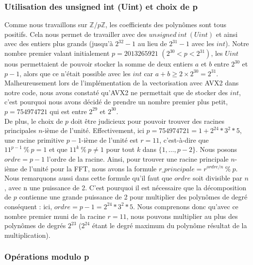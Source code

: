 \documentclass[12pt, a4paper]{article}
\begin{document}
\subsubsection{Utilisation des unsigned int (Uint) et choix de p}

Comme nous travaillons sur $\mathbb{Z}/p\mathbb{Z}$, les coefficients des polynômes sont tous positifs. Cela nous permet de travailler avec des $unsigned\ int\ (Uint)$ et ainsi avec des entiers plus grands (jusqu’à $2^{32}-1$ au lieu de $2^{31}-1$ avec les $int$). Notre nombre premier valant initialement $p=2013265921$ $(2^{30} < p < 2^{31})$, les $Uint$ nous permettaient de pouvoir stocker la somme de deux entiers $a$ et $b$ entre $2^{30}$ et $p-1$, alors que ce n'était possible avec les $int$ car $a+b\geq2\times2^{30}=2^{31}$. \\
\indent Malheureusement lors de l'implémentation de la vectorisation avec AVX2 dans notre code, nous avons constaté qu'AVX2 ne permettait que de stocker des $int$, c'est pourquoi nous avons décidé de prendre un nombre premier plus petit, $p=754974721$ qui est entre $2^{29}$ et  $2^{30}$. \\
\indent De plus, le choix de $p$ doit être judicieux pour pouvoir trouver des racines principales $n$-ième de l'unité. Effectivement, ici $p = 754974721 = 1+2^{24}*3^2*5$, une racine primitive $p-1$-ième de l'unité est $r = 11$, c'est-à-dire que $11^{p-1}\ \%\ p = 1$ et que $11^{k}\ \%\ p \ne 1$ pour tout $k$ dans $\{1,\dots,p-2\}$. Nous posons $ordre = p-1$ l'ordre de la racine. Ainsi, pour trouver une racine principale $n$-ième de l'unité pour la FFT, nous avons la formule $r\_principale = r^{ordre/n}\ \% \ p$. \\
\indent Nous remarquons aussi dans cette formule qu'il faut que $ordre$ soit divisible par $n$, avec n une puissance de 2. C'est pourquoi il est nécessaire que la décomposition de $p$ contienne une grande puissance de 2 pour multiplier des polynômes de degré conséquent : ici, $ordre = p-1 = 2^{24}*3^2*5$. Nous comprenons donc qu'avec ce nombre premier muni de la racine $r = 11$, nous pouvons multiplier au plus des polynômes de degrés $2^{23}$ ($2^{24}$ étant le degré maximum du polynôme résultat de la multiplication).

\subsubsection{Opérations modulo p}
\end{document}
